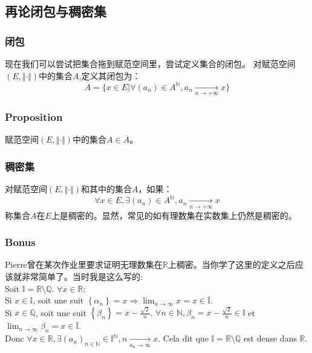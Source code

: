 \documentclass[12pt, a4paper, oneside]{ctexbook}
\begin{document}
  \subsection{再论闭包与稠密集}
  \subsubsection{闭包}
  现在我们可以尝试把集合拖到赋范空间里，尝试定义集合的闭包。
  对赋范空间$(E,\Vert \cdot \Vert)$中的集合$A$,定义其闭包为：
  $$
    \overline{A}=\{x\in E | \forall(a_n)\in A^\mathbb{N},a_n\xrightarrow[n\rightarrow+\infty]{}x\}
  $$

  \subsubsection{Proposition}
  赋范空间$(E,\Vert \cdot \Vert)$中的集合$A\in\overline{A}$。
  \subsubsection{稠密集}
  对赋范空间$(E,\Vert \cdot \Vert)$和其中的集合$A$，如果：
  $$
    \forall x\in E, \exists (a_n)\in A^\mathbb{N}, a_n\xrightarrow[n\rightarrow+\infty]{}x
  $$
  称集合$A$在$E$上是稠密的。显然，常见的如有理数集在实数集上仍然是稠密的。
  \subsubsection{Bonus}
  Pierre曾在某次作业里要求证明无理数集在$\mathbb{R}$上稠密。当你学了这里的定义之后应该就非常简单了。当时我是这么写的:\\

    Soit $\mathbb{I} =\mathbb{R}\setminus \mathbb{Q}$.
    $\forall x\in \mathbb{R}$:\\
    \indent
    Si $x\in \mathbb{I}$, 
    soit une suit $\left \{ \alpha_n \right \}=x \Rightarrow 
    \lim_{n \to \infty}x=x\in \mathbb{\overline{I}}$.\\
    \indent
    Si $x\in \mathbb{Q}$, 
    soit une suit $\left \{ \beta_n \right \}=x-\frac{\sqrt{2}}{n}$. 
    $\forall n\in \mathbb{N}, \beta_n=x-\frac{\sqrt{2}}{n}\in \mathbb{I}$ et 
    $\lim_{n \to \infty}\beta_n=x\in \mathbb{\overline{I}}$.\\
    \indent
    Donc $\forall x\in \mathbb{R}, \exists (a_n)_{n\in\mathbb{N}}\in \mathbb{I}^{\mathbb{N}}, n\xrightarrow[a_n\rightarrow\infty]{}x$. 
    Cela dit que $\mathbb{I}=\mathbb{R}\setminus \mathbb{Q}$ est dense dans $\mathbb{R}$.\\
\end{document}
